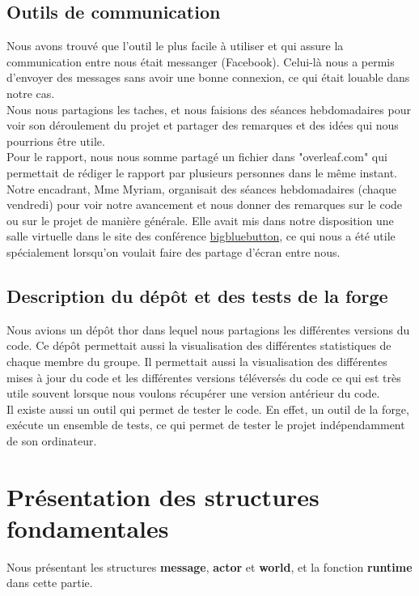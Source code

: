 \documentclass[a4paper]{article}
\begin{document}
\subsection{Outils de communication}
Nous avons trouvé que l'outil le plus facile à utiliser et qui assure la communication entre nous était messanger (Facebook). Celui-là nous a permis d'envoyer des messages sans avoir une bonne connexion, ce qui était louable dans notre cas. \\Nous nous partagions les taches, et nous faisions des séances hebdomadaires pour voir son déroulement du projet et partager des remarques et des idées qui nous pourrions être utile.\\
Pour le rapport, nous nous somme partagé un fichier dans "overleaf.com" qui permettait de rédiger le rapport par plusieurs personnes dans le même instant.\\
Notre encadrant, Mme Myriam, organisait des séances hebdomadaires (chaque vendredi) pour voir notre avancement et nous donner des remarques sur le code ou sur le projet de manière générale. Elle avait mis dans notre disposition une salle virtuelle dans le site des conférence \href{https://bigbluebutton.org/}{bigbluebutton}, ce qui nous a été utile spécialement lorsqu'on voulait faire des partage d'écran entre nous.

\subsection{Description du dépôt et des tests de la forge}
Nous avions un dépôt thor dans lequel nous partagions les différentes versions du code. Ce dépôt permettait aussi la visualisation des différentes statistiques de chaque membre du groupe. Il permettait aussi la visualisation des différentes mises à jour du code et les différentes versions téléversés du code ce qui est très utile souvent lorsque nous voulons récupérer une version antérieur du code.\\
Il existe aussi un outil qui permet de tester le code. En effet, un outil de la forge, exécute un ensemble de tests, ce qui permet de tester le projet indépendamment de son ordinateur.


\section{Présentation des structures fondamentales}
Nous présentant les structures \textbf{message}, \textbf{actor} et \textbf{world}, et la fonction \textbf{runtime} dans cette partie.
\end{document}
